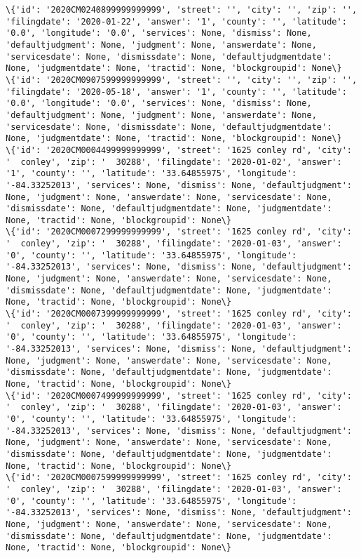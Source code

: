 \documentclass[11pt]{article}
\begin{document}
\begin{Verbatim}[commandchars=\\\{\}]
\{'id': '2020CM0240899999999999', 'street': '', 'city': '', 'zip': '', 'filingdate': '2020-01-22', 'answer': '1', 'county': '', 'latitude': '0.0', 'longitude': '0.0', 'services': None, 'dismiss': None, 'defaultjudgment': None, 'judgment': None, 'answerdate': None, 'servicesdate': None, 'dismissdate': None, 'defaultjudgmentdate': None, 'judgmentdate': None, 'tractid': None, 'blockgroupid': None\}
\{'id': '2020CM0907599999999999', 'street': '', 'city': '', 'zip': '', 'filingdate': '2020-05-18', 'answer': '1', 'county': '', 'latitude': '0.0', 'longitude': '0.0', 'services': None, 'dismiss': None, 'defaultjudgment': None, 'judgment': None, 'answerdate': None, 'servicesdate': None, 'dismissdate': None, 'defaultjudgmentdate': None, 'judgmentdate': None, 'tractid': None, 'blockgroupid': None\}
\{'id': '2020CM0004499999999999', 'street': '1625 conley rd', 'city': '  conley', 'zip': '  30288', 'filingdate': '2020-01-02', 'answer': '1', 'county': '', 'latitude': '33.64855975', 'longitude': '-84.33252013', 'services': None, 'dismiss': None, 'defaultjudgment': None, 'judgment': None, 'answerdate': None, 'servicesdate': None, 'dismissdate': None, 'defaultjudgmentdate': None, 'judgmentdate': None, 'tractid': None, 'blockgroupid': None\}
\{'id': '2020CM0007299999999999', 'street': '1625 conley rd', 'city': '  conley', 'zip': '  30288', 'filingdate': '2020-01-03', 'answer': '0', 'county': '', 'latitude': '33.64855975', 'longitude': '-84.33252013', 'services': None, 'dismiss': None, 'defaultjudgment': None, 'judgment': None, 'answerdate': None, 'servicesdate': None, 'dismissdate': None, 'defaultjudgmentdate': None, 'judgmentdate': None, 'tractid': None, 'blockgroupid': None\}
\{'id': '2020CM0007399999999999', 'street': '1625 conley rd', 'city': '  conley', 'zip': '  30288', 'filingdate': '2020-01-03', 'answer': '0', 'county': '', 'latitude': '33.64855975', 'longitude': '-84.33252013', 'services': None, 'dismiss': None, 'defaultjudgment': None, 'judgment': None, 'answerdate': None, 'servicesdate': None, 'dismissdate': None, 'defaultjudgmentdate': None, 'judgmentdate': None, 'tractid': None, 'blockgroupid': None\}
\{'id': '2020CM0007499999999999', 'street': '1625 conley rd', 'city': '  conley', 'zip': '  30288', 'filingdate': '2020-01-03', 'answer': '0', 'county': '', 'latitude': '33.64855975', 'longitude': '-84.33252013', 'services': None, 'dismiss': None, 'defaultjudgment': None, 'judgment': None, 'answerdate': None, 'servicesdate': None, 'dismissdate': None, 'defaultjudgmentdate': None, 'judgmentdate': None, 'tractid': None, 'blockgroupid': None\}
\{'id': '2020CM0007599999999999', 'street': '1625 conley rd', 'city': '  conley', 'zip': '  30288', 'filingdate': '2020-01-03', 'answer': '0', 'county': '', 'latitude': '33.64855975', 'longitude': '-84.33252013', 'services': None, 'dismiss': None, 'defaultjudgment': None, 'judgment': None, 'answerdate': None, 'servicesdate': None, 'dismissdate': None, 'defaultjudgmentdate': None, 'judgmentdate': None, 'tractid': None, 'blockgroupid': None\}

\end{Verbatim}
\end{document}
